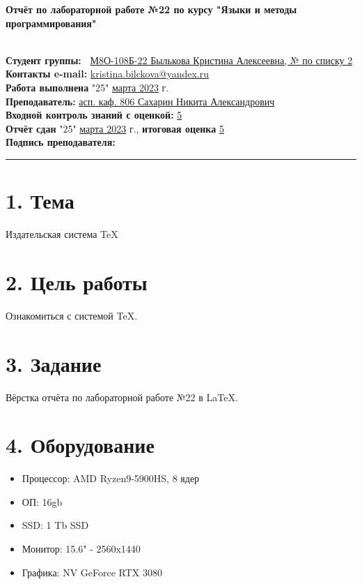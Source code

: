 \documentclass[a4paper]{report} %
\begin{document}
\noindent
\textbf{\Large Отчёт по лабораторной работе №22 по курсу "Языки и методы программирования"} \\

\hline
 
 \textbf{\\Студент группы:~} \underline{М8О-108Б-22 Былькова Кристина Алексеевна, № по списку 2} \\
\textbf{Контакты e-mail:} \href{mailto:kristina.bilckova@yandex.ru}{kristina.bilckova@yandex.ru} \\
\textbf{Работа выполнена} "25" \underline{марта 2023} г. \\
\textbf{Преподаватель:} \underline{асп. каф. 806 Сахарин Никита Александрович} \\
\textbf{Входной контроль знаний с оценкой:} \underline{5}\\
\textbf{Отчёт сдан} "25" \underline{марта 2023} г., \textbf{итоговая оценка} \underline{5} \\
\textbf{Подпись преподавателя:} \rule{60}{0.03}


\section*{1. Тема}
Издательская система TeX
\blindtext

\section*{2. Цель работы}
Ознакомиться с системой TeX.    
\blindtext

\section*{3. Задание}
Вёрстка отчёта по лабораторной работе №22 в LaTeX.
\blindtext

\section*{4. Оборудование}
\begin{itemize}
    \item Процессор: AMD Ryzen9-5900HS, 8 ядер
    \item ОП: 16gb
    \item SSD: 1 Tb SSD
    \item Монитор: 15.6" - 2560x1440
    \item Графика: NV GeForce RTX 3080
\end{itemize}
\end{document}
